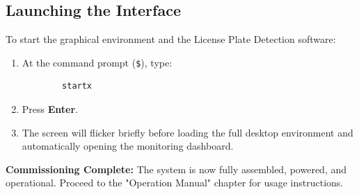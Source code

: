 \subsection{Launching the Interface}
To start the graphical environment and the License Plate Detection software:
\begin{enumerate}
	\item At the command prompt (\texttt{\$}), type:
	\begin{verbatim}
		startx
	\end{verbatim}
	\item Press \textbf{Enter}.
	\item The screen will flicker briefly before loading the full desktop environment and automatically opening the monitoring dashboard.
\end{enumerate}

\noindent
\textbf{Commissioning Complete:} The system is now fully assembled, powered, and operational. Proceed to the "Operation Manual" chapter for usage instructions.